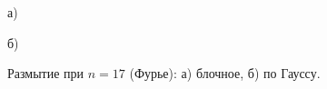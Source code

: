 \documentclass[a5paper, 10pt]{article}
\theoremstyle{definition}
\theoremstyle{plain}
\theoremstyle{remark}
\begin{document}
\begin{figure}[h!]
\begin{minipage}[h!]{0.47\linewidth}
 а) \\
\end{minipage}
\hfill
\begin{minipage}[h!]{0.47\linewidth}
 б) \\
\end{minipage}
\caption{Размытие при $n= 17$ (Фурье): а) блочное, б) по Гауссу.}
\end{figure}
\end{document}
